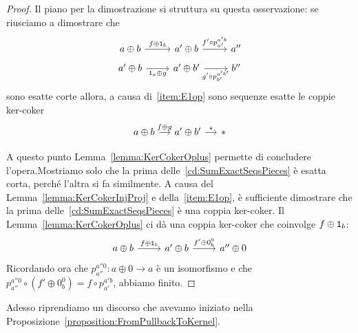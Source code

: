 \begin{proof}
  Il piano per la dimostrazione si struttura su questa osservazione:
  se riusciamo a dimostrare che
  \begin{equation}
    \begin{tikzcd}[row sep=tiny]
      a \oplus b \ar["{f \oplus \id_b}", r] & a' \oplus b \ar["{f' \circ p_{a'}^{a'b}}",
      r] & a'' \\
      a' \oplus b \ar["{\id_a \oplus g}", r, swap] & a' \oplus b' \ar["{g' \circ
        p_{b'}^{a'b'}}", r, swap] & b''
    \end{tikzcd}
    \label{cd:SumExactSeqsPieces}
  \end{equation}
  sono esatte corte allora, a causa di~\ref{item:E1op} sono sequenze
  esatte le coppie ker-coker
  \[
    \begin{tikzcd}[column sep=small, row sep=tiny]
      a \oplus b \ar["{f \oplus g}", r] & a' \oplus b' \ar["\ast",
      r] & \ast \\
    \end{tikzcd}
  \]
  A questo punto Lemma~\ref{lemma:KerCokerOplus} permette di
  concludere l'opera.\newline Mostriamo solo che la prima
  delle~\eqref{cd:SumExactSeqsPieces} è esatta corta, perché l'altra
  si fa similmente. A causa del Lemma~\ref{lemma:KerCokerInjProj} e
  della~\ref{item:E1op}, è sufficiente dimostrare che la prima
  delle~\ref{cd:SumExactSeqsPieces} è una coppia ker-coker. Il
  Lemma~\ref{lemma:KerCokerOplus} ci dà una coppia ker-coker che
  coinvolge \(f \oplus \mathtt 1_b\):
  \[
    \begin{tikzcd}
      a \oplus b \ar["{f \oplus \id_b}", r] & a' \oplus b \ar["{f' \oplus 0_b^0}", r] &
      a'' \oplus 0
    \end{tikzcd}
  \]
  Ricordando ora che \(p_{a''}^{a''0} : a \oplus 0 \to a\) è un isomorfismo e
  che
  \(p_{a''}^{a''0} \circ \left( f' \oplus 0_b^0 \right) = f \circ p_{a'}^{a'b}\),
  abbiamo finito.
\end{proof}

Adesso riprendiamo un discorso che avevamo iniziato nella Proposizione~\ref{proposition:FromPullbackToKernel}.



